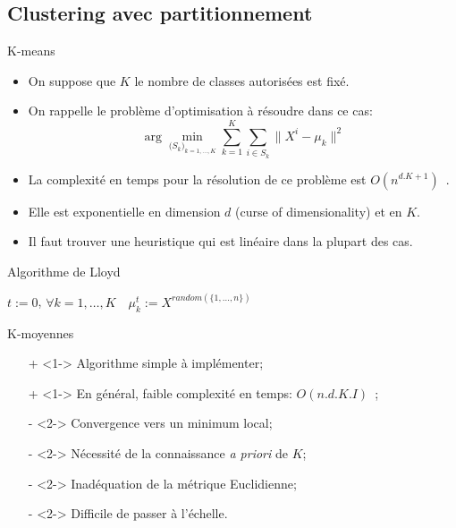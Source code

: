 \documentclass[8pt]{beamer}
\begin{document}
		\subsection{Clustering avec partitionnement}
			\begin{frame}{K-means}
				\begin{itemize}
					\item<1-> On suppose que \(K\) le nombre de classes autorisées est fixé.
					\item<2-> On rappelle le problème d'optimisation à résoudre dans ce cas:
						\begin{equation}
							\arg \min_{\big(S_k\big)_{k = 1, \dots, K}} \sum_{k= 1}^{K} \sum_{i\in S_k} \lVert X^i - \mu_k\rVert^2
						\end{equation}
					\item<3-> La complexité en temps pour la résolution de ce problème est \(O(n^{d.K+1})\)~\cite{inaba1994applications}.
					\item<4-> Elle est exponentielle en dimension \(d\) (curse of dimensionality) et en \(K\).
					\item<5-> Il faut trouver une heuristique qui est linéaire dans la plupart des cas.
				\end{itemize}
			\end{frame}
			\begin{frame}{Algorithme de Lloyd}
				
				\begin{algorithm}[H]

					\(t := 0\), \(\forall k = 1,\dots,K \quad \mu^t_k := X^{random(\{1,\dots,n\})}\)\;
				\end{algorithm}
			\end{frame}
			\begin{frame}{K-moyennes}
				\begin{itemize}
					\item[\color{green}+]<1-> Algorithme simple à implémenter;
					\item[\color{green}+]<1-> En général, faible complexité en temps: \(O(n.d.K.I)\)~\cite{lloyd1982least};
					\item[\color{red}-]<2-> Convergence vers un minimum local;
					\item[\color{red}-]<2-> Nécessité de la connaissance \textit{a priori} de \(K\);
					\item[\color{red}-]<2-> Inadéquation de la métrique Euclidienne;
					\item[\color{red}-]<2-> Difficile de passer à l'échelle.
				\end{itemize}
			\end{frame}
\end{document}
